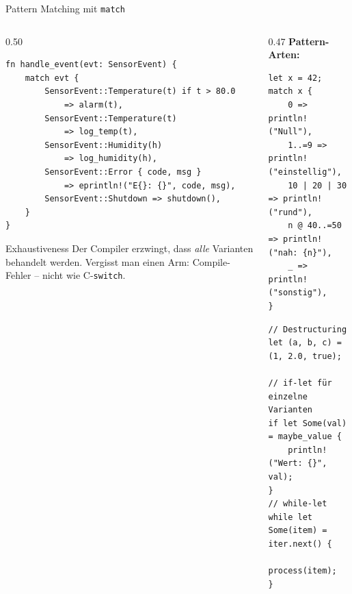 \documentclass[%
  aspectratio=169,
  10pt
]{beamer}
\begin{document}
\begin{frame}[fragile]{Pattern Matching mit \texttt{match}}
  \begin{columns}[T]
    \begin{column}{0.50\textwidth}
\begin{lstlisting}
fn handle_event(evt: SensorEvent) {
    match evt {
        SensorEvent::Temperature(t) if t > 80.0
            => alarm(t),
        SensorEvent::Temperature(t)
            => log_temp(t),
        SensorEvent::Humidity(h)
            => log_humidity(h),
        SensorEvent::Error { code, msg }
            => eprintln!("E{}: {}", code, msg),
        SensorEvent::Shutdown => shutdown(),
    }
}
\end{lstlisting}
      \begin{alertblock}{Exhaustiveness}
        \small Der Compiler erzwingt, dass \emph{alle} Varianten
        behandelt werden. Vergisst man einen Arm:
        Compile-Fehler -- nicht wie C-\texttt{switch}.
      \end{alertblock}
    \end{column}
    \begin{column}{0.47\textwidth}
      \textbf{Pattern-Arten:}
\begin{lstlisting}
let x = 42;
match x {
    0 => println!("Null"),
    1..=9 => println!("einstellig"),
    10 | 20 | 30 => println!("rund"),
    n @ 40..=50 => println!("nah: {n}"),
    _ => println!("sonstig"),
}
\end{lstlisting}
\begin{lstlisting}
// Destructuring
let (a, b, c) = (1, 2.0, true);

// if-let für einzelne Varianten
if let Some(val) = maybe_value {
    println!("Wert: {}", val);
}
// while-let
while let Some(item) = iter.next() {
    process(item);
}
\end{lstlisting}
    \end{column}
  \end{columns}
\end{frame}
\end{document}
